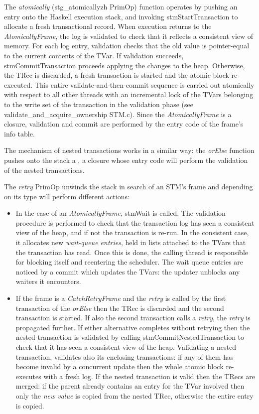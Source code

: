 The \emph{atomically} (stg\_atomicallyzh PrimOp) function operates by pushing an  entry onto the Haskell execution stack, and invoking stmStartTransaction to allocate a fresh transactional record.
When execution returns to the \emph{AtomicallyFrame}, the log is validated to check that it reflects a consistent view of memory.
For each log entry, validation checks that the old value is pointer-equal to the current contents of the TVar.
If validation succeeds, stmCommitTransaction proceeds applying the changes to the heap. Otherwise, the TRec is discarded, a fresh transaction is started and the atomic block re-executed.
This entire validate-and-then-commit sequence is carried out atomically with respect to all other threads with an incremental lock of the TVars belonging to the write set of the transaction in the validation phase (see validate\_and\_acquire\_ownership STM.c).
Since the \emph{AtomicallyFrame} is a closure, validation and commit are performed by the entry code of the frame's info table.

The mechanism of nested transactions works in a similar way: the \emph{orElse} function pushes onto the stack a , a closure whose entry code will perform the validation of the nested transactions.

The \emph{retry} PrimOp unwinds the stack in search of an STM's frame and depending on its type will perform different actions:
\begin{itemize}
\item
In the case of an \emph{AtomicallyFrame}, stmWait is called.
The validation procedure is performed to check that the transaction log has seen a consistent view of the heap, and if not the transaction is re-run.
In the consistent case, it allocates new \emph{wait-queue entries}, held in  lists attached to the TVars that the transaction has read.
Once this is done, the calling thread is responsible for blocking itself and reentering the scheduler. The wait queue entries are noticed by a commit which updates the TVars: the updater unblocks any waiters it encounters.
\item
If the frame is a \emph{CatchRetryFrame} and the \emph{retry} is called by the first transaction of the \emph{orElse} then the TRec is discarded and the second transaction is started. If also the second transaction calls a \emph{retry}, the \emph{retry} is propagated further.
If either alternative completes without retrying then the nested transaction is validated by calling stmCommitNestedTransaction to check that it has seen a consistent view of the heap. Validating a nested transaction, validates also its enclosing transactions: if any of them has become invalid by a concurrent update then the whole atomic block re-executes with a fresh log.  If the nested transaction is valid then the TRecs are merged: if the parent already contains an entry for the TVar involved then only the \emph{new value} is copied from the nested TRec, otherwise the entire entry is copied.
\end{itemize}


